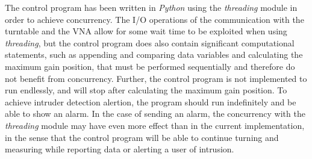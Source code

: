 The control program has been written in \textit{Python} using the \textit{threading} module in order to achieve concurrency. The I/O operations of the communication with the turntable and the VNA allow for some wait time to be exploited when using \textit{threading}, but the control program does also contain significant computational statements, such as appending and comparing data variables and calculating the maximum gain position, that must be performed sequentially and therefore do not benefit from concurrency. Further, the control program is not implemented to run endlessly, and will stop after calculating the maximum gain position. To achieve intruder detection alertion, the program should run indefinitely and be able to show an alarm. In the case of sending an alarm, the concurrency with the \textit{threading} module may have even more effect than in the current implementation, in the sense that the control program will be able to continue turning and measuring while reporting data or alerting a user of intrusion.

